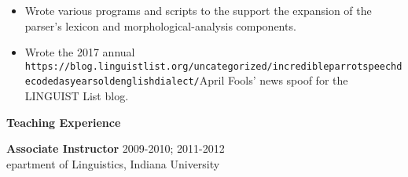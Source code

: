 \begin{singlespace}
\begin{itemize}
\item Wrote various programs and scripts to the support the expansion of the parser's lexicon and morphological-analysis components. 
\item Wrote the 2017 annual \texttt{https://blog.linguistlist.org/uncategorized/incredible\-parrot\-speech\-decoded\-as\-years\-old\-english\-dialect/}{April Fools' news spoof}  for the LINGUIST List blog. %
\end{itemize}
\newpage
\thispagestyle{empty}
\centerline{\textbf{ Teaching Experience}}
\vspace{6pt}
\noindent\textbf{Associate Instructor} \hfill 2009-2010; 2011-2012 \\
epartment of Linguistics, Indiana University


\end{singlespace}
